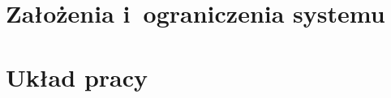 
\section{Założenia i~ograniczenia systemu}
\label{sec:zalozenia}



\section{Układ pracy}
\label{sec:ukladPracy}

